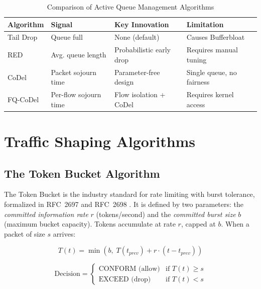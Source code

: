 \begin{table}[H]
\centering
\caption{Comparison of Active Queue Management Algorithms}
\label{tab:aqm_comparison}
\begin{tabularx}{\textwidth}{l X X X}
\toprule
\textbf{Algorithm} & \textbf{Signal} & \textbf{Key Innovation} & \textbf{Limitation} \\
\midrule
Tail Drop  & Queue full & None (default) & Causes Bufferbloat \\
RED \cite{floyd_1993}  & Avg. queue length & Probabilistic early drop & Requires manual tuning \\
CoDel \cite{rfc8289} & Packet sojourn time & Parameter-free design & Single queue, no fairness \\
FQ-CoDel \cite{rfc8290} & Per-flow sojourn time & Flow isolation + CoDel & Requires kernel access \\
\bottomrule
\end{tabularx}
\end{table}

\section{Traffic Shaping Algorithms}
\label{sec:algorithms}

\subsection{The Token Bucket Algorithm}

The Token Bucket \cite{tanenbaum_2011} is the industry standard for rate limiting with burst tolerance, formalized in RFC~2697 \cite{rfc2697} and RFC~2698 \cite{rfc2698}. It is defined by two parameters: the \textit{committed information rate} $r$ (tokens/second) and the \textit{committed burst size} $b$ (maximum bucket capacity). Tokens accumulate at rate $r$, capped at $b$. When a packet of size $s$ arrives:

\begin{equation}
T(t) = \min\left(b, \; T(t_{prev}) + r \cdot (t - t_{prev})\right)
\label{eq:token_refill}
\end{equation}

\begin{equation}
\text{Decision} = \begin{cases} \text{CONFORM (allow)} & \text{if } T(t) \geq s \\[4pt] \text{EXCEED (drop)} & \text{if } T(t) < s \end{cases}
\label{eq:token_decision}
\end{equation}

